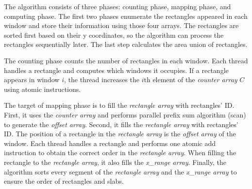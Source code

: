 The algorithm consists of three phases: counting phase, mapping phase, and computing phase.  The first two phases enumerate the rectangles appeared in each window and store their information using those four arrays.  The rectangles are sorted first based on their y coordinates, so the algorithm can process the rectangles sequentially later.  The last step calculates the area union of rectangles.

The counting phase counts the number of rectangles in each window.  Each thread handles a rectangle and computes which windows it occupies.  If a rectangle appears in window $i$, the thread increases the $i$th element of the \textit{counter array} $C$ using atomic instructions.

The target of mapping phase is to fill the \textit{rectangle array} with rectangles' ID. First, it uses the \textit{counter array} and performs parallel prefix sum algorithm (scan) \cite{ref} to generate the \textit{offset array}. Second, it fills the \textit{rectangle array} with rectangles' ID. The position of a rectangle in the \textit{rectangle array} is the \textit{offset array} of the window.  Each thread handles a rectangle and performs one atomic add instruction to obtain the correct order in the \textit{rectangle array}.  When filling the rectangle to the \textit{rectangle array}, it also fills the \textit{x\_range array}.  Finally, the algorithm sorts every segment of the \textit{rectangle array} and the \textit{x\_range array} to ensure the order of rectangles and slabs. 

